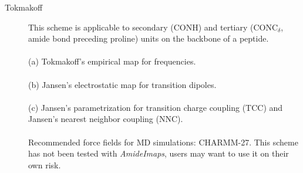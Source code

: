 \documentclass[12pt]{book}
\begin{document}
\begin{description}
\item[Tokmakoff]
This scheme is applicable to secondary (CONH) and tertiary (CONC$_{\delta}$, amide bond preceding proline) units on the backbone of a peptide.\cite{Reppert.2013.138.134116}
\\\\
(a) Tokmakoff's empirical map for frequencies.\cite{Reppert.2013.138.134116}
\\\\
(b) Jansen's electrostatic map for transition dipoles.\cite{Jansen.2006.JCP.124.044502,Roy.2011.JCP.135.234507}
\\\\
(c) Jansen's parametrization for transition charge coupling (TCC) and Jansen's nearest neighbor coupling (NNC).\cite{Jansen.2006.JCP.124.044502,Jansen.2006.JCP.125.044312,Roy.2011.JCP.135.234507} 
\\\\
Recommended force fields for MD simulations: CHARMM-27.
This scheme has not been tested with \textit{AmideImaps}, users may want to use it on their own risk. 


\end{description}
\end{document}
